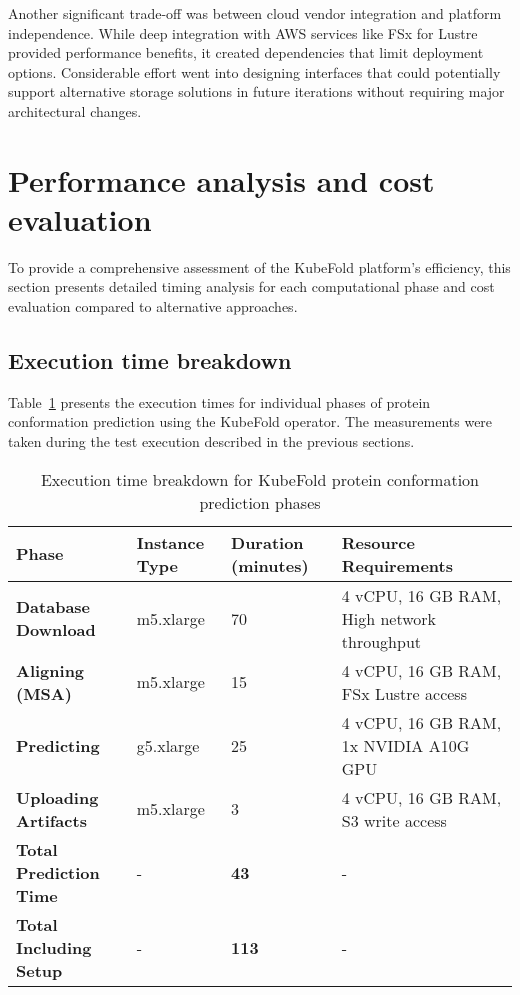 Another significant trade-off was between cloud vendor integration and platform independence. While deep integration with AWS services like FSx for Lustre provided performance benefits, it created dependencies that limit deployment options. Considerable effort went into designing interfaces that could potentially support alternative storage solutions in future iterations without requiring major architectural changes.

\section{Performance analysis and cost evaluation}

To provide a comprehensive assessment of the KubeFold platform's efficiency, this section presents detailed timing analysis for each computational phase and cost evaluation compared to alternative approaches.

\subsection{Execution time breakdown}

Table~\ref{tab:phase_timing} presents the execution times for individual phases of protein conformation prediction using the KubeFold operator. The measurements were taken during the test execution described in the previous sections.

\begin{table}[H]
    \centering
    \small
    \begin{tabularx}{\textwidth}{|X|X|X|X|}
        \hline
        \textbf{Phase} & \textbf{Instance Type} & \textbf{Duration (minutes)} & \textbf{Resource Requirements} \\
        \hline
        \textbf{Database Download} & m5.xlarge & 70 & 4 vCPU, 16 GB RAM, High network throughput \\
        \hline
        \textbf{Aligning (MSA)} & m5.xlarge & 15 & 4 vCPU, 16 GB RAM, FSx Lustre access \\
        \hline
        \textbf{Predicting} & g5.xlarge & 25 & 4 vCPU, 16 GB RAM, 1x NVIDIA A10G GPU \\
        \hline
        \textbf{Uploading Artifacts} & m5.xlarge & 3 & 4 vCPU, 16 GB RAM, S3 write access \\
        \hline
        \textbf{Total Prediction Time} & - & \textbf{43} & - \\
        \hline
        \textbf{Total Including Setup} & - & \textbf{113} & - \\
        \hline
    \end{tabularx}
    \caption{Execution time breakdown for KubeFold protein conformation prediction phases}
    \label{tab:phase_timing}
\end{table}

